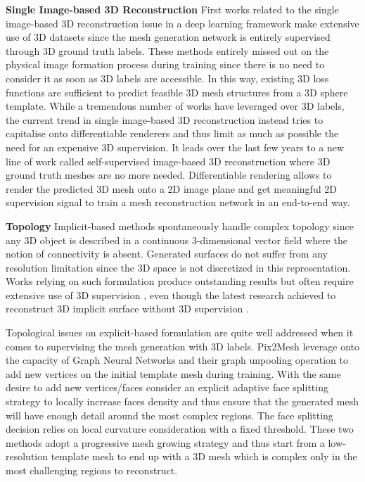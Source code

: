 \noindent\textbf{Single Image-based 3D Reconstruction} First works related to the single image-based 3D reconstruction issue in a deep learning framework \citep{choy20163d,girdhar2016learning,yang2018dense} make extensive use of 3D datasets \citep{chang2015shapenet,sun2018pix3d} since the mesh generation network is entirely supervised through 3D ground truth labels. These methods entirely missed out on the physical image formation process during training since there is no need to consider it as soon as 3D labels are accessible. In this way, existing 3D loss functions are sufficient to predict feasible 3D mesh structures from a 3D sphere template. While a tremendous number of works have leveraged over 3D labels, the current trend in single image-based 3D reconstruction instead tries to capitalise onto differentiable renderers and thus limit as much as possible the need for an expensive 3D supervision. It leads over the last few years to a new line of work called self-supervised image-based 3D reconstruction  \citep{kanazawa2018learning,li2020self,pavllo2020convolutional,henderson2020leveraging} where 3D ground truth meshes are no more needed. Differentiable rendering allows to render the predicted 3D mesh onto a 2D image plane and get meaningful 2D supervision signal to train a mesh reconstruction network in an end-to-end way. 

\noindent\textbf{Topology} Implicit-based methods spontaneously handle complex topology since any 3D object is described in a continuous 3-dimensional vector field where the notion of connectivity is absent. Generated surfaces do not suffer from any resolution limitation since the 3D space is not discretized in this representation. Works relying on such formulation produce outstanding results but often require extensive use of 3D supervision \citep{saito2020pifuhd}, even though the latest research achieved to reconstruct 3D implicit surface without 3D supervision \citep{niemeyer2020differentiable,liu2019learning}. 

Topological issues on explicit-based formulation are quite well addressed when it comes to supervising the mesh generation with 3D labels. Pix2Mesh \citep{wang2018pixel2mesh} leverage onto the capacity of Graph Neural Networks and their graph unpooling operation to add new vertices on the initial template mesh during training. With the same desire to add new vertices/faces \citep{smith2019geometrics} consider an explicit adaptive face splitting strategy to locally increase faces density and thus ensure that the generated mesh will have enough detail around the most complex regions. The face splitting decision relies on local curvature consideration with a fixed threshold. These two methods adopt a progressive mesh growing strategy and thus start from a low-resolution template mesh to end up with a 3D mesh which is complex only in the most challenging regions to reconstruct.

